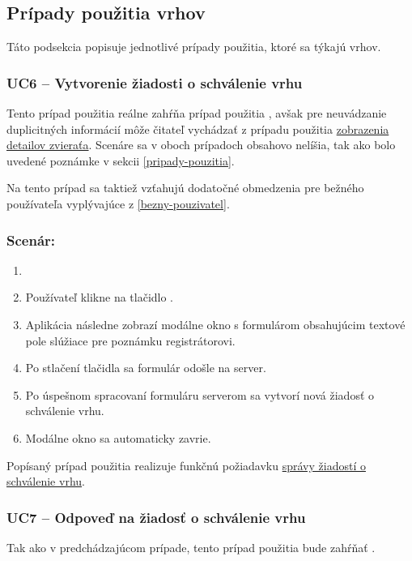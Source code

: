\subsection{Prípady použitia vrhov}
Táto podsekcia popisuje jednotlivé prípady použitia, ktoré sa týkajú vrhov.

\subsubsection{UC6 -- Vytvorenie žiadosti o schválenie vrhu}

Tento prípad použitia reálne zahŕňa prípad použitia , avšak pre neuvádzanie duplicitných informácií môže čitateľ vychádzať z prípadu použitia \hyperref[uc2]{zobrazenia detailov zvieraťa}. Scenáre sa v oboch prípadoch obsahovo nelíšia, tak ako bolo uvedené poznámke v sekcii \ref{pripady-pouzitia}.

Na tento prípad sa taktiež vzťahujú dodatočné obmedzenia pre bežného používateľa vyplývajúce z \ref{bezny-pouzivatel}.

\subsubsection*{Scenár:}

\begin{enumerate}
	\item {}
	\item Používateľ klikne na tlačidlo .
	\item Aplikácia následne zobrazí modálne okno s formulárom obsahujúcim textové pole slúžiace pre poznámku registrátorovi.
	\item Po stlačení tlačidla  sa formulár odošle na server.
	\item Po úspešnom spracovaní formuláru serverom sa vytvorí nová žiadosť o schválenie vrhu.
	\item Modálne okno sa automaticky zavrie.
\end{enumerate}

Popísaný prípad použitia realizuje funkčnú požiadavku \hyperref[sprava-ziadosti-o-schvalenie-vrhu]{správy žiadostí o schválenie vrhu}.

\subsubsection{UC7 -- Odpoveď na žiadosť o schválenie vrhu}

Tak ako v predchádzajúcom prípade, tento prípad použitia bude zahŕňať .

